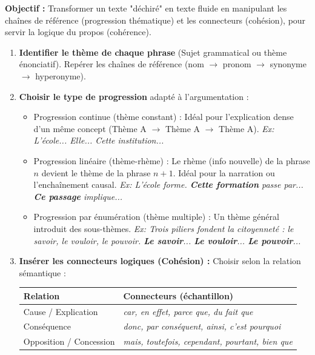 \documentclass[11pt]{article}
\newcommand{\cle}[1]{{\popxbold\color{popdark}#1}}
\begin{document}
\begin{methode}
    \textbf{Objectif :} Transformer un texte "déchiré" en texte fluide en manipulant les chaînes de référence (progression thématique) et les connecteurs (cohésion), pour servir la logique du propos (cohérence).
    \begin{enumerate}
        \item \textbf{Identifier le thème de chaque phrase} (Sujet grammatical ou thème énonciatif). Repérer les \cle{chaînes de référence} (nom $\rightarrow$ pronom $\rightarrow$ synonyme $\rightarrow$ hyperonyme).
        \item \textbf{Choisir le type de progression} adapté à l'argumentation :
            \begin{itemize}
                \item \cle{Progression continue (thème constant)} : Idéal pour l'explication dense d'un même concept (Thème A $\rightarrow$ Thème A $\rightarrow$ Thème A). \textit{Ex: L'école... Elle... Cette institution...}
                \item \cle{Progression linéaire (thème-rhème)} : Le rhème (info nouvelle) de la phrase $n$ devient le thème de la phrase $n+1$. Idéal pour la narration ou l'enchaînement causal. \textit{Ex: L'école forme. \textbf{Cette formation} passe par... \textbf{Ce passage} implique...}
                \item \cle{Progression par énumération (thème multiple)} : Un thème général introduit des sous-thèmes. \textit{Ex: Trois piliers fondent la citoyenneté : le savoir, le vouloir, le pouvoir. \textbf{Le savoir}... \textbf{Le vouloir}... \textbf{Le pouvoir}...}
            \end{itemize}
        \item \textbf{Insérer les connecteurs logiques (Cohésion) :} Choisir selon la relation sémantique : 
            \begin{center}
            \begin{tabularx}{\linewidth}{|l|X|}\hline
            \textbf{Relation} & \textbf{Connecteurs (échantillon)} \\ \hline
            Cause / Explication & \emph{car, en effet, parce que, du fait que} \\ \hline
            Conséquence & \emph{donc, par conséquent, ainsi, c'est pourquoi} \\ \hline
            Opposition / Concession & \emph{mais, toutefois, cependant, pourtant, bien que} \\ \hline

\end{tabularx}
\end{center}
\end{enumerate}
\end{methode}
\end{document}
